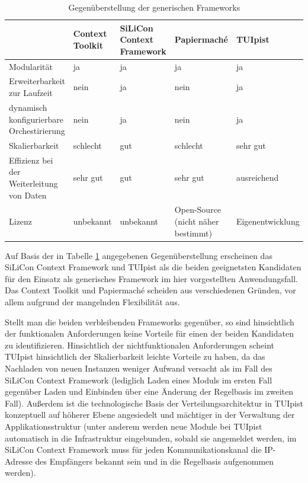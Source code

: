 \begin{table}[htbp]
	\centering
	\caption{Gegenüberstellung der generischen Frameworks}
	\begin{tabular}{| p{3cm} || p{2cm} | p{2cm} | p{2cm} | p{2cm} |} \hline
		 & Context Toolkit & SiLiCon Context Framework & Papiermaché & TUIpist \\ \hline \hline
		Modularität & ja & ja & ja & ja \\ \hline
		Erweiterbarkeit zur Laufzeit & nein & ja & nein & ja \\ \hline
		dynamisch konfigurierbare Orchestirierung & nein & ja & nein & ja \\ \hline
		Skalierbarkeit & schlecht & gut & schlecht & sehr gut \\ \hline
		Effizienz bei der Weiterleitung von Daten & sehr gut & gut & sehr gut & ausreichend \\ \hline
		Lizenz & unbekannt & unbekannt & Open-Source (nicht näher bestimmt) & Eigen\-entwicklung \\ \hline
	\end{tabular}
	\label{tab:generischeFrameworks}
\end{table}

Auf Basis der in Tabelle \ref{tab:generischeFrameworks} angegebenen Gegenüberstellung erscheinen das SiLiCon Context Framework und TUIpist als die beiden geeignetsten Kandidaten für den Einsatz als generisches Framework im hier vorgestellten Anwendungsfall. Das Context Toolkit und Papiermaché scheiden aus verschiedenen Gründen, vor allem aufgrund der mangelnden Flexibilität aus.

Stellt man die beiden verbleibenden Frameworks gegenüber, so sind hinsichtlich der funktionalen Anforderungen keine Vorteile für einen der beiden Kandidaten zu identifizieren. Hinsichtlich der nichtfunktionalen Anforderungen scheint TUIpist hinsichtlich der Skalierbarkeit leichte Vorteile zu haben, da das Nachladen von neuen Instanzen weniger Aufwand versacht als im Fall des SiLiCon Context Framework (lediglich Laden eines Moduls im ersten Fall gegenüber Laden und Einbinden über eine Änderung der Regelbasis im zweiten Fall). Außerdem ist die technologische Basis der Verteilungsarchitektur in TUIpist konzeptuell auf höherer Ebene angesiedelt und mächtiger in der Verwaltung der Applikationsstruktur (unter anderem werden neue Module bei TUIpist automatisch in die Infrastruktur eingebunden, sobald sie angemeldet werden, im SiLiCon Context Framework muss für jeden Kommunikationskanal die IP-Adresse des Empfängers bekannt sein und in die Regelbasis aufgenommen werden). 

